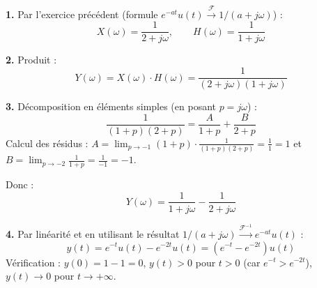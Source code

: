 \documentclass[12pt,a4paper]{article}
\begin{document}
\begin{boitecorrige}
\textbf{1.} Par l'exercice précédent (formule $e^{-at}u(t) \xrightarrow{\mathcal{F}} 1/(a+j\omega)$) :
\[
X(\omega) = \frac{1}{2+j\omega}, \qquad H(\omega) = \frac{1}{1+j\omega}
\]

\textbf{2.} Produit :
\[
Y(\omega) = X(\omega)\cdot H(\omega) = \frac{1}{(2+j\omega)(1+j\omega)}
\]

\textbf{3.} Décomposition en éléments simples (en posant $p = j\omega$) :
\[
\frac{1}{(1+p)(2+p)} = \frac{A}{1+p} + \frac{B}{2+p}
\]
Calcul des résidus : $A = \displaystyle\lim_{p\to-1}(1+p)\cdot\frac{1}{(1+p)(2+p)} = \frac{1}{1} = 1$ et $B = \displaystyle\lim_{p\to-2}\frac{1}{1+p} = \frac{1}{-1} = -1$.

Donc :
\[
Y(\omega) = \frac{1}{1+j\omega} - \frac{1}{2+j\omega}
\]

\textbf{4.} Par linéarité et en utilisant le résultat $1/(a+j\omega) \xrightarrow{\mathcal{F}^{-1}} e^{-at}u(t)$ :
\[
\boxed{y(t) = e^{-t}u(t) - e^{-2t}u(t) = \left(e^{-t} - e^{-2t}\right)u(t)}
\]
Vérification : $y(0) = 1 - 1 = 0$, $y(t) > 0$ pour $t > 0$ (car $e^{-t} > e^{-2t}$), $y(t) \to 0$ pour $t \to +\infty$.
\end{boitecorrige}

\ifdefined\inMainDoc\else
\end{document}
